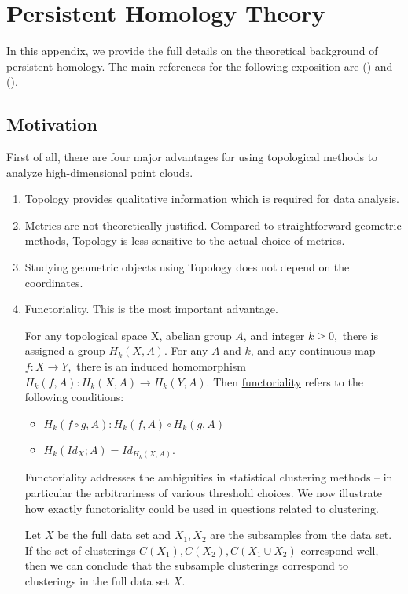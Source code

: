 \chapter{Persistent Homology Theory} 
\label{AppendixA} 

In this appendix, we provide the full details on the theoretical background of persistent homology.
The main references for the following exposition are (\cite{carlsson_topology_2009}) and (\cite{zomorodian_computing_nodate}).

\section{Motivation}

First of all, there are four major advantages for using topological methods to analyze high-dimensional point clouds.

\begin{enumerate}
	\item Topology provides qualitative information which is required for data analysis.
	
	\item Metrics are not theoretically justified. Compared to straightforward geometric methods, Topology is less sensitive to the actual choice of metrics. 
	
	\item Studying geometric objects using Topology does not depend on the coordinates. 
	
	\item Functoriality. This is the most important advantage.
	
	\begin{defn}[Functoriality]
	
		For any topological space X, abelian group $A$, and integer $k\geq 0,$ there is assigned a group $H_k(X,A).$ For any $A$ and $k$, and any continuous map $f: X \to Y,$ there is an induced homomorphism $H_k(f,A): H_k(X,A) \to H_k(Y,A).$ Then \underline{functoriality} refers to the following conditions:
		\begin{itemize}
			\item  $H_k(f\circ g,A): H_k(f,A) \circ H_k(g,A)$
			\item  $H_k(Id_{X};A) = Id_{H_k(X,A)}.$
		\end{itemize}
	\end{defn}
	Functoriality addresses the ambiguities in statistical clustering methods -- in particular the arbitrariness of various threshold choices. We now illustrate how exactly functoriality could be used in questions related to clustering. 
	
	Let $X$ be the full data set and $X_1,X_2$ are the subsamples from the data set. If the set of clusterings $C(X_1), C(X_2), C(X_1 \cup X_2)$ correspond well, then we can conclude that the subsample clusterings correspond to clusterings in the full data set $X$. 
\end{enumerate}

